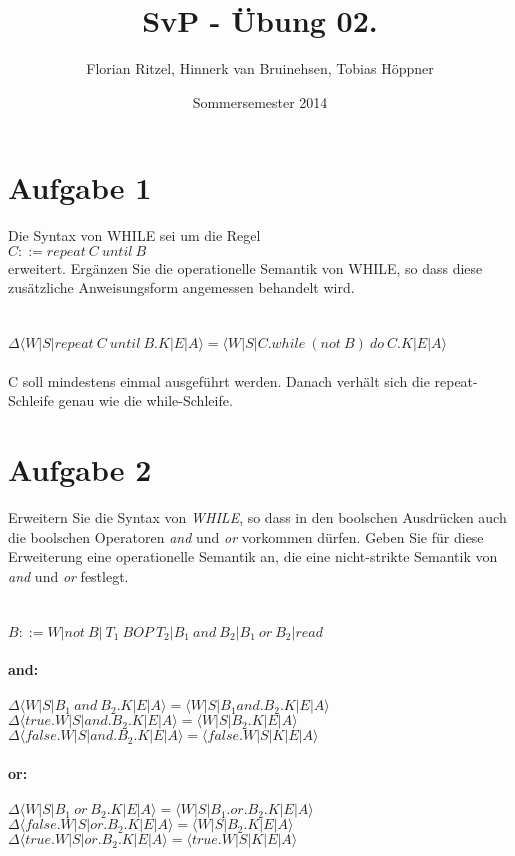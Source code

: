 \documentclass[ngerman,a4paper]{report}
\author{Florian Ritzel, Hinnerk van Bruinehsen, Tobias Höppner}
\title{SvP - Übung 02. }
\date{Sommersemester 2014}
\renewcommand{\maketitle}{}
\begin{document}
 
\maketitle 
\section*{Aufgabe 1}
Die Syntax von WHILE sei um die Regel\\
$C::= repeat\ C\ until\ B$\\
erweitert. Ergänzen Sie die operationelle Semantik von WHILE, so dass diese zusätzliche Anweisungsform angemessen behandelt wird.\\\\\\
$\Delta\langle W|S|repeat\ C\ until\ B.K|E|A\rangle = \langle W|S|C.while\ (not\ B)\ do\ C.K|E|A\rangle$\\\\
C soll mindestens einmal ausgeführt werden. Danach verhält sich die repeat-Schleife genau wie die while-Schleife.

\section*{Aufgabe 2}

Erweitern Sie die Syntax von \emph{WHILE}, so dass in den boolschen Ausdrücken auch die boolschen Operatoren \textit{and} und \textit{or} vorkommen dürfen. Geben Sie für diese Erweiterung eine operationelle Semantik an, die eine nicht-strikte Semantik von \textit{and} und \textit{or} festlegt.\\\\\\
$B::=W|not\ B|\ T_1\ BOP\ T_2| B_1\ and\  B_2| B_1\ or\ B_2| read$\\\\
\textbf{and:}\\\\
$\Delta\langle W|S|B_1\ and\ B_2.K|E|A\rangle = \langle W|S|B_1 and.B_2.K|E|A\rangle$\\
$\Delta\langle true.W|S|and.B_2.K|E|A\rangle = \langle W|S|B_2.K|E|A\rangle$\\
$\Delta\langle false.W|S|and.B_2.K|E|A\rangle = \langle false.W|S|K|E|A\rangle$\\\\
\textbf{or:}\\\\
$\Delta\langle W|S|B_1\ or\ B_2.K|E|A\rangle = \langle W|S|B_1.or.B_2.K|E|A\rangle$\\
$\Delta\langle false.W|S|or.B_2.K|E|A\rangle = \langle W|S|B_2.K|E|A\rangle$\\
$\Delta\langle true.W|S|or.B_2.K|E|A\rangle = \langle true.W|S|K|E|A\rangle$\\
\end{document}
